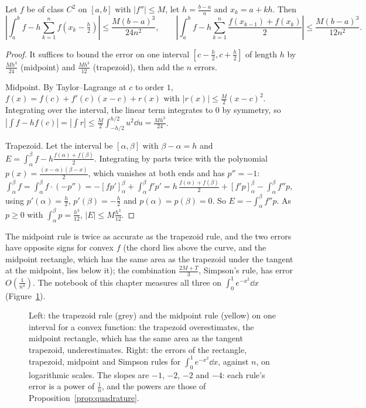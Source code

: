 \begin{proposition}\label{prop:quadrature}
Let $f$ be of class $C^2$ on $[a,b]$ with $|f''|\le M$, let $h=\frac{b-a}n$ and $x_k=a+kh$. Then
\[
\left|\int_a^bf-h\sum_{k=1}^nf\!\left(x_k-\tfrac h2\right)\right|\le\frac{M(b-a)^3}{24n^2},\qquad
\left|\int_a^bf-h\sum_{k=1}^n\frac{f(x_{k-1})+f(x_k)}2\right|\le\frac{M(b-a)^3}{12n^2}.
\]
\end{proposition}
\begin{proof}
It suffices to bound the error on one interval $[c-\frac h2,c+\frac h2]$ of length $h$ by $\frac{Mh^3}{24}$ (midpoint) and $\frac{Mh^3}{12}$ (trapezoid), then add the $n$ errors.

Midpoint. By Taylor--Lagrange at $c$ to order $1$, $f(x)=f(c)+f'(c)(x-c)+r(x)$ with $|r(x)|\le\frac M2(x-c)^2$. Integrating over the interval, the linear term integrates to $0$ by symmetry, so
$\left|\int f-hf(c)\right|=\left|\int r\right|\le\frac M2\int_{-h/2}^{h/2}u^2\dd u=\frac{Mh^3}{24}$.

Trapezoid. Let the interval be $[\alpha,\beta]$ with $\beta-\alpha=h$ and $E=\int_\alpha^\beta f-h\frac{f(\alpha)+f(\beta)}2$. Integrating by parts twice with the polynomial $p(x)=\frac{(x-\alpha)(\beta-x)}2$, which vanishes at both ends and has $p''=-1$:
$\int_\alpha^\beta f=\int_\alpha^\beta f\cdot(-p'')=-\left[fp'\right]_\alpha^\beta+\int_\alpha^\beta f'p'=h\,\frac{f(\alpha)+f(\beta)}2+\left[f'p\right]_\alpha^\beta-\int_\alpha^\beta f''p$, using $p'(\alpha)=\frac h2$, $p'(\beta)=-\frac h2$ and $p(\alpha)=p(\beta)=0$. So $E=-\int_\alpha^\beta f''p$. As $p\ge0$ with $\int_\alpha^\beta p=\frac{h^3}{12}$, $|E|\le M\frac{h^3}{12}$.
\end{proof}

The midpoint rule is twice as accurate as the trapezoid rule, and the two errors have opposite signs for convex $f$ (the chord lies above the curve, and the midpoint rectangle, which has the same area as the trapezoid under the tangent at the midpoint, lies below it); the combination $\frac{2M+T}3$, Simpson's rule, has error $O\left(\frac1{n^4}\right)$. The notebook of this chapter measures all three on $\int_0^1e^{-x^2}\dd x$ (Figure~\ref{fig:quadrature}).

\begin{figure}[ht]
\centering
{}
\caption{Left: the trapezoid rule (grey) and the midpoint rule (yellow) on one interval for a convex function: the trapezoid overestimates, the midpoint rectangle, which has the same area as the tangent trapezoid, underestimates. Right: the errors of the rectangle, trapezoid, midpoint and Simpson rules for $\int_0^1e^{-x^2}\dd x$, against $n$, on logarithmic scales. The slopes are $-1$, $-2$, $-2$ and $-4$: each rule's error is a power of $\frac1n$, and the powers are those of Proposition~\ref{prop:quadrature}.}
\label{fig:quadrature}
\end{figure}

